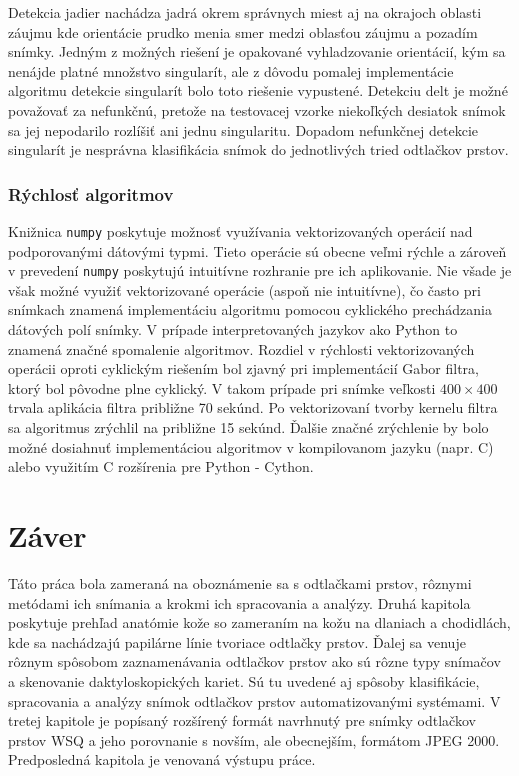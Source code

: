   Detekcia jadier nachádza jadrá okrem správnych miest aj na okrajoch oblasti záujmu kde orientácie prudko menia smer medzi oblasťou záujmu a pozadím snímky.
  Jedným z možných riešení je opakované vyhladzovanie orientácií, kým sa nenájde platné množstvo singularít, ale z dôvodu pomalej implementácie algoritmu
  detekcie singularít bolo toto riešenie vypustené.
  Detekciu delt je možné považovať za nefunkčnú, pretože na testovacej vzorke niekoľkých desiatok snímok sa jej nepodarilo rozlíšiť ani jednu singularitu.
  Dopadom nefunkčnej detekcie singularít je nesprávna klasifikácia snímok do jednotlivých tried odtlačkov prstov.

  \subsection{Rýchlosť algoritmov}
  Knižnica \texttt{numpy} poskytuje možnosť využívania vektorizovaných operácií nad podporovanými dátovými typmi. Tieto operácie sú obecne veľmi rýchle
  a zároveň v prevedení \texttt{numpy} poskytujú intuitívne rozhranie pre ich aplikovanie. Nie všade je však možné využiť vektorizované operácie
  (aspoň nie intuitívne), čo často pri snímkach znamená implementáciu algoritmu pomocou cyklického prechádzania dátových polí snímky. V prípade interpretovaných
  jazykov ako Python to znamená značné spomalenie algoritmov. Rozdiel v rýchlosti vektorizovaných operácii oproti cyklickým riešením bol zjavný pri
  implementácií Gabor filtra, ktorý bol pôvodne plne cyklický. V takom prípade pri snímke veľkosti $400 \times 400$ trvala aplikácia filtra približne 70 sekúnd.
  Po vektorizovaní tvorby kernelu filtra sa algoritmus zrýchlil na približne 15 sekúnd. Ďalšie značné zrýchlenie by bolo možné dosiahnuť implementáciou
  algoritmov v kompilovanom jazyku (napr. C) alebo využitím C rozšírenia pre Python - Cython.


  \chapter{Záver}
  Táto práca bola zameraná na oboznámenie sa s odtlačkami prstov, rôznymi metódami ich snímania a krokmi ich spracovania a analýzy. Druhá kapitola poskytuje
  prehľad anatómie kože so zameraním na kožu na dlaniach a chodidlách, kde sa nachádzajú papilárne línie tvoriace odtlačky prstov. Ďalej sa venuje rôznym
  spôsobom zaznamenávania odtlačkov prstov ako sú rôzne typy snímačov a skenovanie daktyloskopických kariet. Sú tu uvedené aj spôsoby klasifikácie, spracovania
  a analýzy snímok odtlačkov prstov automatizovanými systémami. V tretej kapitole je popísaný rozšírený formát navrhnutý pre snímky odtlačkov prstov WSQ a jeho
  porovnanie s novším, ale obecnejším, formátom JPEG 2000. Predposledná kapitola je venovaná výstupu práce.

